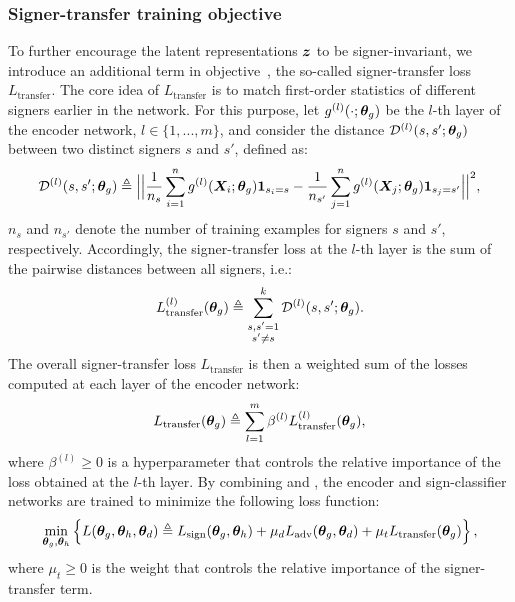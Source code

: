 \subsubsection{Signer-transfer training objective}
To further encourage the latent representations ${\bm{z}}$ to be signer-invariant, we introduce an additional term in objective~, the so-called signer-transfer loss $L_{\text{transfer}}$. The core idea of $L_{\text{transfer}}$ is to match first-order statistics of different signers earlier in the network. For this purpose, let $g^{(l)}(\cdot;{\bm{\theta}}_g)$ be the $l$-th layer of the encoder network, $l \in \{1,...,m\}$, and consider the distance ${\mathcal{D}}^{(l)}(s, s'; {\bm{\theta}}_g)$ between two distinct signers $s$ and $s'$, defined as:
\begin{equation}
    \label{eq:sign_transfer_pairwise_loss}
    {\mathcal{D}}^{(l)}(s, s'; {\bm{\theta}}_g) \triangleq \Big|\Big| \frac{1}{n_s} \sum_{i=1}^n g^{(l)}({\bm{X}}_{i}; {\bm{\theta}}_g) \bm{1}_{s_i = s} - \frac{1}{n_{s'}}\sum_{j=1}^n g^{(l)}({\bm{X}}_{j}; {\bm{\theta}}_g) \bm{1}_{s_j = s'} \Big|\Big|^2,
\end{equation}
$n_s$ and $n_{s'}$ denote the number of training examples for signers $s$ and $s'$, respectively. Accordingly, the signer-transfer loss at the $l$-th layer is the sum of the pairwise distances between all signers, i.e.:
\begin{equation}
    L_{\text{transfer}}^{(l)}({\bm{\theta}}_g) \triangleq \sum_{\substack{s,s'=1 \\ s' \neq s}}^k {\mathcal{D}}^{(l)}(s,s'; {\bm{\theta}}_g).
\end{equation}
The overall signer-transfer loss $L_{\text{transfer}}$ is then a weighted sum of the losses computed at each layer of the encoder network:
\begin{equation}
    \label{eq:signer_transfer_loss}
    L_{\text{transfer}}({\bm{\theta}}_g) \triangleq \sum_{l=1}^{m} \beta^{(l)} L_{\text{transfer}}^{(l)}({\bm{\theta}}_g),
\end{equation}
where $\beta^{(l)}\geq 0$ is a hyperparameter that controls the relative importance of the loss obtained at the $l$-th layer.
By combining  and , the encoder and sign-classifier networks are trained to minimize the following loss function:
\begin{equation}
    \label{eq:enc_sign_loss}
    \min_{{\bm{\theta}}_g, {\bm{\theta}}_h} \left\lbrace L({\bm{\theta}}_g, {\bm{\theta}}_h, {\bm{\theta}}_d) \triangleq L_{\text{sign}}({\bm{\theta}}_g, {\bm{\theta}}_h) + \mu_d L_{\text{adv}}({\bm{\theta}}_g, {\bm{\theta}}_d) +
    \mu_t L_{\text{transfer}}({\bm{\theta}}_g) \right\rbrace,
\end{equation}
where $\mu_t \geq 0$ is the weight that controls the relative importance of the signer-transfer term.

